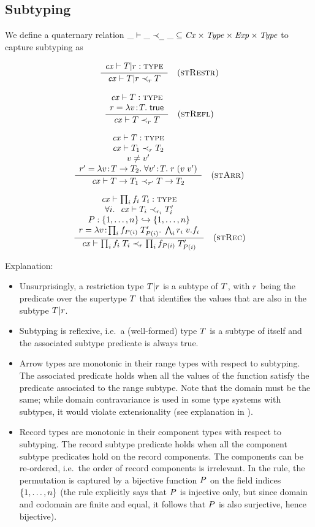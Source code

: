 \subsection{Subtyping}

We define a quaternary relation $\_\vdash\_\prec_{\_}\_\subseteq\mathit{Cx}\times\mathit{Type}\times\mathit{Exp}\times\mathit{Type}$ to
capture subtyping as

\[
\frac{\begin{array}{c}\mathit{cx}\vdash T|r:\textsc{type}\end{array}}{\mathit{cx}\vdash T|r\prec_{r}T}\quad\mbox{(\textsc{stRestr})}
\]

\[
\frac{\begin{array}{c}\mathit{cx}\vdash T:\textsc{type}\\r=\lambda v\!:\!T.\;\mathsf{true}\end{array}}{\mathit{cx}\vdash T\prec_{r}T}\quad\mbox{(\textsc{stRefl})}
\]

\[
\frac{\begin{array}{c}\mathit{cx}\vdash T:\textsc{type}\\\mathit{cx}\vdash T_1\prec_{r}T_2\\v\neq v'\\r'=\lambda v\!:\!T\to T_2.\;\forall v'\!:\!T.\;r\;(v\;v')\end{array}}{\mathit{cx}\vdash T\to T_1\prec_{r'}T\to T_2}\quad\mbox{(\textsc{stArr})}
\]

\[
\frac{\begin{array}{c}\mathit{cx}\vdash\prod_{i}f_i\;T_i:\textsc{type}\\\forall i.\ \ \mathit{cx}\vdash T_i\prec_{r_i}T_i'\\P:\{1,\ldots,n\}\hookrightarrow\{1,\ldots,n\}\\r=\lambda v\!:\!\prod_{i}f_{P(i)}\;T_{P(i)}'.\;\bigwedge_{i}r_i\;v.f_i\end{array}}{\mathit{cx}\vdash\prod_{i}f_i\;T_i\prec_{r}\prod_{i}f_{P(i)}\;T_{P(i)}'}\quad\mbox{(\textsc{stRec})}
\]

Explanation:
\begin{itemize}
\item
Unsurprisingly, a restriction type $T|r$ is a subtype of $T$, with
$r$ being the predicate over the supertype $T$ that identifies the
values that are also in the subtype $T|r$.
\item
Subtyping is reflexive, i.e.\ a (well-formed) type $T$ is a subtype of
itself and the associated subtype predicate is always true.
\item
Arrow types are monotonic in their range types with respect to subtyping. The
associated predicate holds when all the values of the function satisfy the
predicate associated to the range subtype. Note that the domain must be the
same; while domain contravariance is used in some type systems with subtypes,
it would violate extensionality (see explanation in \cite{pvs-seman}).
\item
Record types are monotonic in their component types with respect to
subtyping. The record subtype predicate holds when all the component subtype
predicates hold on the record components. The components can be re-ordered,
i.e.\ the order of record components is irrelevant. In the rule, the
permutation is captured by a bijective function $P$ on the field indices
$\{1,\ldots,n\}$ (the rule explicitly says that $P$ is injective only, but
since domain and codomain are finite and equal, it follows that $P$ is
also surjective, hence bijective).
\end{itemize}

